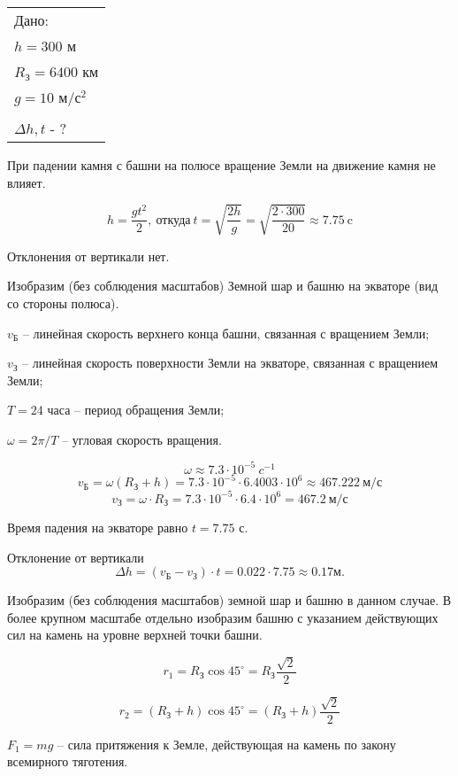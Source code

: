 \solutionSection

\begin{tabular}{l|}
    Дано: \\
    $h = 300$ м \\
    $R_\text{З} = 6400$ км \\
    $g= 10$ м/с$^2$ \\
    \hline \\
    $\Delta h, t$ - ?
\end{tabular}

При падении камня с башни на полюсе вращение Земли на движение камня не влияет.

$$h = \frac{gt^2}{2}, \: \text{откуда} \: t=\sqrt{\frac{2h}{g}} = \sqrt{\frac{2\cdot 300}{20}} \approx 7.75 \: \text{c}$$
 
Отклонения от вертикали нет.

Изобразим (без соблюдения масштабов) Земной шар и башню на экваторе (вид со стороны полюса).
 

$v_\text{Б}$ – линейная скорость верхнего конца башни, связанная с вращением Земли;

$v_\text{З}$ – линейная скорость поверхности Земли на экваторе, связанная с вращением Земли;

$T=24$ часа – период обращения Земли;

$\omega =2 \pi /T$ – угловая скорость вращения. 

$$\omega \approx 7.3\cdot 10^{-5} \: c^{-1}$$
$$v_\text{Б}= \omega (R_\text{З}+h)= 7.3\cdot 10^{-5}\cdot 6.4003\cdot 10^6 \approx 467.222 \: \text{м/с}$$
$$v_\text{З}=\omega \cdot R_\text{З}=7.3\cdot 10^{-5}\cdot 6.4\cdot 10^6=467.2 \: \text{м/с}$$

Время падения на экваторе равно $t = 7.75$ с.

Отклонение от вертикали 
$$\Delta h=( v_\text{Б} - v_\text{З})\cdot t=0.022\cdot 7.75 \approx 0.17 \text{м}.$$

Изобразим  (без соблюдения масштабов) земной шар и башню в данном случае. В более крупном масштабе отдельно изобразим башню с указанием действующих сил на камень на уровне верхней точки башни.


$$r_1 = R_\text{З} \cos 45^\circ = R_\text{З} \frac{\sqrt{2}}{2}$$

$$r_2 = (R_\text{З} + h) \cos 45^\circ = (R_\text{З} + h) \frac{\sqrt{2}}{2}$$
 
$F_1=mg$ – сила притяжения к Земле, действующая на камень по закону всемирного тяготения.

